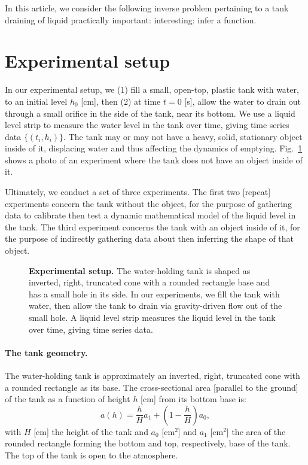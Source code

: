 \documentclass[openacc]{rsproca_new}%
\begin{document}
In this article, we consider the following inverse problem pertaining to a tank draining of liquid
practically important:
interesting: infer a function. 


\section{Experimental setup}
In our experimental setup, we (1) fill a small, open-top, plastic tank with water, to an initial level $h_0$ [cm], then (2) at time $t=0$ [s], allow the water to drain out through a small orifice in the side of the tank, near its bottom. 
We use a liquid level strip to measure the water level in the tank over time, giving time series data $\{(t_i, h_i)\}$. The tank may or may not have a heavy, solid, stationary object inside of it, displacing water and thus affecting the dynamics of emptying. Fig.~\ref{fig:photo_of_tank} shows a photo of an experiment where the tank does not have an object inside of it.

Ultimately, we conduct a set of three experiments. The first two [repeat] experiments concern the tank without the object, for the purpose of gathering data to calibrate then test a dynamic mathematical model of the liquid level in the tank. The third experiment concerns the tank with an object inside of it, for the purpose of indirectly gathering data about then inferring the shape of that object.

\begin{figure}[h!]
\begin{center}
	\caption{\textbf{Experimental setup.} 
	The water-holding tank is shaped as inverted, right, truncated cone with a rounded rectangle base and has a small hole in its side. In our experiments, we fill the tank with water, then allow the tank to drain via gravity-driven flow out of the small hole. A liquid level strip measures the liquid level in the tank over time, giving time series data.
	}
	\label{fig:photo_of_tank}
\end{center}
\end{figure}

\paragraph{The tank geometry.} The water-holding tank is approximately an inverted, right, truncated cone with a rounded rectangle as its base. The cross-sectional area [parallel to the ground] of the tank as a function of height $h$ [cm] from its bottom base is:
\begin{equation}
	a(h) = \frac{h}{H}a_1 + \left(1-\frac{h}{H}\right) a_0,
\end{equation}
with $H$ [cm] the height of the tank and $a_0$ [cm$^2$] and $a_1$ [cm$^2$] the area of the rounded rectangle forming the bottom and top, respectively, base of the tank.
The top of the tank is open to the atmosphere. 
\end{document}
